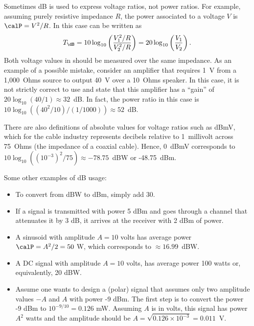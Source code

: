 Sometimes dB is used to express voltage ratios, not power ratios. For example, assuming purely
resistive impedance $R$, the power associated to a voltage $V$ is $\calP = V^2/R$.
In this case  can be written as
\begin{equation}
T_\dB = 10 \log_{10} \left( \frac{V_1^2/R}{V_2^2/R} \right)= 20 \log_{10} \left( \frac{V_1}{V_2} \right).
\label{eq:decibelAsVoltageRatios}
\end{equation}
Both voltage values in  should be measured over the same impedance. As an example of a possible mistake, consider an amplifier that requires 1~V from a
1,000~Ohms source to output 40~V over a 10~Ohms speaker. In this case, it is not strictly correct to use  and state that this amplifier has a ``gain'' of 
$20 \log_{10} (40/1) \approx 32$~dB. In fact, the power ratio in this case is $10 \log_{10} ((40^2/10)/(1/1000)) \approx 52$~dB.

There are also definitions of absolute values for voltage ratios such as dBmV, which for the cable industry represents decibels relative to 1~millivolt across 75~Ohms (the impedance of a coaxial cable). Hence, 0~dBmV corresponds to $10 \log_{10} ((10^{-3})^2/75) \approx -78.75$~dBW or -48.75~dBm.

Some other examples of dB usage:
\begin{itemize}
	\item To convert from dBW to dBm, simply add 30.
	\item If a signal is transmitted with power 5 dBm and goes through a channel that attenuates it by 3 dB, it arrives at the receiver with 2 dBm of power.
	\item A sinusoid with amplitude $A=10$ volts has average power $\calP=A^2/2 = 50$ W, which corresponds to $\approx 16.99$~dBW.
	\item A DC signal with amplitude $A=10$ volts, has average power 100 watts or, equivalently, 20 dBW.
	\item Assume one wants to design a (polar) signal that assumes only two amplitude values $-A$ and $A$ with power -9 dBm. The first step is to convert the power -9 dBm to $10^{-9/10}=0.126$ mW. Assuming $A$ is in volts, this signal has power $A^2$ watts and the amplitude should be $A = \sqrt{0.126 \times 10^{-3}} = 0.011$~V.
\end{itemize}

